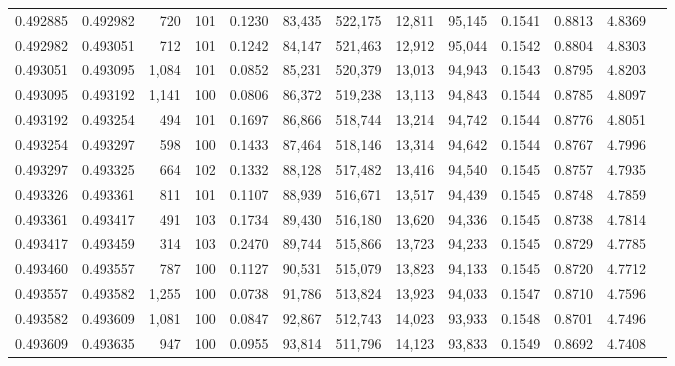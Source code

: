 \begin{tabular}{rrrrrrrrrrrrr}
0.492885 & 0.492982 &   720 & 101 &                                     0.1230 &  83,435 & 522,175 &  12,811 &  95,145 & 0.1541 & 0.8813 & 4.8369 \\
0.492982 & 0.493051 &   712 & 101 &                                     0.1242 &  84,147 & 521,463 &  12,912 &  95,044 & 0.1542 & 0.8804 & 4.8303 \\
0.493051 & 0.493095 & 1,084 & 101 &                                     0.0852 &  85,231 & 520,379 &  13,013 &  94,943 & 0.1543 & 0.8795 & 4.8203 \\
0.493095 & 0.493192 & 1,141 & 100 &                                     0.0806 &  86,372 & 519,238 &  13,113 &  94,843 & 0.1544 & 0.8785 & 4.8097 \\
0.493192 & 0.493254 &   494 & 101 &                                     0.1697 &  86,866 & 518,744 &  13,214 &  94,742 & 0.1544 & 0.8776 & 4.8051 \\
0.493254 & 0.493297 &   598 & 100 &                                     0.1433 &  87,464 & 518,146 &  13,314 &  94,642 & 0.1544 & 0.8767 & 4.7996 \\
0.493297 & 0.493325 &   664 & 102 &                                     0.1332 &  88,128 & 517,482 &  13,416 &  94,540 & 0.1545 & 0.8757 & 4.7935 \\
0.493326 & 0.493361 &   811 & 101 &                                     0.1107 &  88,939 & 516,671 &  13,517 &  94,439 & 0.1545 & 0.8748 & 4.7859 \\
0.493361 & 0.493417 &   491 & 103 &                                     0.1734 &  89,430 & 516,180 &  13,620 &  94,336 & 0.1545 & 0.8738 & 4.7814 \\
0.493417 & 0.493459 &   314 & 103 &                                     0.2470 &  89,744 & 515,866 &  13,723 &  94,233 & 0.1545 & 0.8729 & 4.7785 \\
0.493460 & 0.493557 &   787 & 100 &                                     0.1127 &  90,531 & 515,079 &  13,823 &  94,133 & 0.1545 & 0.8720 & 4.7712 \\
0.493557 & 0.493582 & 1,255 & 100 &                                     0.0738 &  91,786 & 513,824 &  13,923 &  94,033 & 0.1547 & 0.8710 & 4.7596 \\
0.493582 & 0.493609 & 1,081 & 100 &                                     0.0847 &  92,867 & 512,743 &  14,023 &  93,933 & 0.1548 & 0.8701 & 4.7496 \\
0.493609 & 0.493635 &   947 & 100 &                                     0.0955 &  93,814 & 511,796 &  14,123 &  93,833 & 0.1549 & 0.8692 & 4.7408 \\

\end{tabular}
